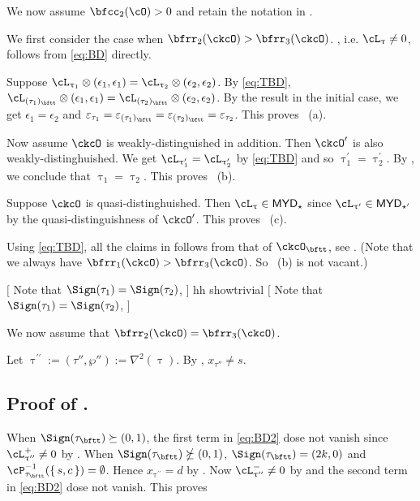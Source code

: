 \documentclass[12pt,a4paper]{amsart}
\newcommand{\trivial}[2][]{\if\relax\detokenize{#1}\relax
  {%
      \color{orange} \vspace{0em} $[$  #2 $]$
      \color{black}
  }
  \else
\ifx#1h
\ifcsname showtrivial\endcsname
{%
    \color{orange} \vspace{0em}  $[$ #2 $]$
    \color{black}
}
\fi
\else {\red Wrong argument!} \fi
\fi
}
\newcommand{\AC}{\mathrm{AC}}
\def\MYD{{\mathsf{MYD}}}
\def\pac#1{\ac_{#1}^+}
\def\nac#1{\ac_{#1}^-}
\def\AC{\mathrm{AC}}
\def\ac{\cL}
\def\lotimes{\otimes}
\def\DD{\nabla}
\numberwithin{equation}{section}
\theoremstyle{remark}
\def\uptaup{\uptau^{\prime}}
\def\uptaupp{\uptau^{\prime\prime}}
\begin{document}
\medskip

We now assume $\bfcc_{2}(\cO)>0$ and retain the notation in .

We first consider the case when $\bfrr_{2}(\ckcO)>\bfrr_{3}(\ckcO)$.
, i.e. $\ac_{\uptau}\neq 0$, follows from \eqref{eq:BD} directly.

Suppose $\ac_{\uptau_1}\lotimes (\epsilon_{1},\epsilon_{1})
= \ac_{\uptau_2}\lotimes( \epsilon_{2},\epsilon_{2} )$.
By \eqref{eq:TBD},
$\cL_{(\tau_{1})_{\bftt}}\lotimes(\epsilon_{1},\epsilon_{1}) =
\cL_{(\tau_{2})_{\bftt}}\lotimes(\epsilon_{2},\epsilon_{2})$.
By the result in the initial case, we get $\epsilon_{1}=\epsilon_{2}$ and
$\varepsilon_{\tau_{1}}=\varepsilon_{(\tau_{1})_{\bftt}}=\varepsilon_{(\tau_{2})_{\bftt}}=\varepsilon_{\tau_{2}}$.
This proves ~(a).

\smallskip

Now assume $\ckcO$ is weakly-distinguished in addition. Then $\ckcO'$ is also
weakly-distinghuished.
We get $\ac_{\uptaup_{1}}=\ac_{\uptaup_{2}}$ by \eqref{eq:TBD} and so $\uptaup_{1}=\uptaup_{2}$.
By , we conclude that $\uptau_{1}=\uptau_{2}$. This proves
~(b).


\smallskip

Suppose $\ckcO$ is quasi-distinghuished. Then $\ac_{\uptau}\in \MYD_{\star}$
since $\ac_{\uptau'}\in \MYD_{\star'}$ by the quasi-distinguishness of
$\ckcO'$.
This proves ~(c).


\smallskip

Using \eqref{eq:TBD}, all the claims in  follows from that of
$\ckcO_{\bftt}$, see . (Note that we always have
$\bfrr_{1}(\ckcO)>\bfrr_{3}(\ckcO)$. So ~(b) is not vacant.)

\trivial[h]{
Note that $\Sign(\tau_{1})=\Sign(\tau_{2})$,
}

\medskip


We now assume that $\bfrr_{2}(\ckcO)=\bfrr_{3}(\ckcO)$.

Let $\uptaupp :=(\tau'',\wp''):= \DD^{2}(\uptau)$.
By , $x_{\tau''}\neq s$.


\subsection*{\bf Proof of . }
When $\Sign(\tau_{\bftt})\succeq (0,1)$, the first term in \eqref{eq:BD2} dose
not vanish since $\pac{\uptaupp}\neq 0$ by .
When $\Sign(\tau_{\bftt})\nsucceq (0,1)$, $\Sign(\tau_{\bftt}) = (2k,0)$ and
$\cP_{\tau_{\bftt}}^{-1}(\set{s,c})=\emptyset$. Hence
  $x_{\uptaupp}=d$ by . Now $\nac{\uptaupp} \neq 0$ by
   and
  the second term in \eqref{eq:BD2} dose not vanish.
This proves 
\end{document}
